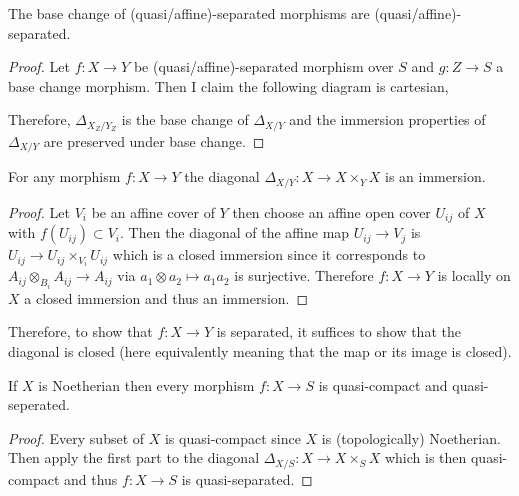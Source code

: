 \documentclass[12pt]{article}
\begin{document}
\begin{lemma}
The base change of (quasi/affine)-separated morphisms are (quasi/affine)-separated. 
\end{lemma}

\begin{proof}
Let $f : X \to Y$ be (quasi/affine)-separated morphism over $S$ and $g : Z \to S$ a base change morphism. Then I claim the following diagram is cartesian,
\begin{center}
\end{center}
Therefore, $\Delta_{X_Z/Y_Z}$ is the base change of $\Delta_{X/Y}$ and the immersion properties of $\Delta_{X/Y}$ are preserved under base change.
\end{proof}

\begin{lemma}
For any morphism $f : X \to Y$ the diagonal $\Delta_{X / Y} : X \to X \times_Y X$ is an immersion.
\end{lemma}

\begin{proof}
Let $V_i$ be an affine cover of $Y$ then choose an affine open cover $U_{ij}$ of $X$ with $f(U_{ij}) \subset V_i$. Then the diagonal of the affine map $U_{ij} \to V_j$ is $U_{ij} \to U_{ij} \times_{V_i} U_{ij}$ which is a closed immersion since it corresponds to $A_{ij} \otimes_{B_i} A_{ij} \to A_{ij}$ via $a_1 \otimes a_2 \mapsto a_1 a_2$ is surjective. Therefore $f : X \to Y$ is locally on $X$ a closed immersion and thus an immersion. 
\end{proof}

\begin{rmk}
Therefore, to show that $f : X \to Y$ is separated, it suffices to show that the diagonal is closed (here equivalently meaning that the map or its image is closed). 
\end{rmk}

\begin{lemma}
If $X$ is Noetherian then every morphism $f : X \to S$ is quasi-compact and quasi-seperated. 
\end{lemma}

\begin{proof}
Every subset of $X$ is quasi-compact since $X$ is (topologically) Noetherian. Then apply the first part to the diagonal $\Delta_{X/S} : X \to X \times_S X$ which is then quasi-compact and thus $f : X \to S$ is quasi-separated.
\end{proof}
\end{document}
